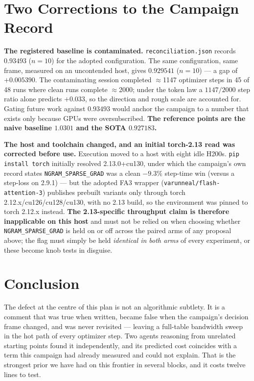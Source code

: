 \documentclass{article}
\begin{document}
\section{Two Corrections to the Campaign Record}
\textbf{The registered baseline is contaminated.} \texttt{reconciliation.json} records $0.93493$ ($n{=}10$) for the adopted configuration. The same configuration, same frame, measured on an uncontended host, gives $0.929541$ ($n{=}10$) --- a gap of $+0.005390$. The contaminating session completed $\approx$1147 optimizer steps in 45 of 48 runs where clean runs complete $\approx$2000; under the token law a $1147/2000$ step ratio alone predicts $+0.033$, so the direction and rough scale are accounted for. Gating future work against $0.93493$ would anchor the campaign to a number that exists only because GPUs were oversubscribed. \textbf{The reference points are the naive baseline $1.0301$ and the SOTA $0.927183$.}

\textbf{The host and toolchain changed, and an initial torch-2.13 read was corrected before use.} Execution moved to a host with eight idle H200s. \texttt{pip install torch} initially resolved 2.13.0+cu130, under which the campaign's own record states \texttt{NGRAM\_SPARSE\_GRAD} was a clean $-9.3\%$ step-time win (versus a step-loss on 2.9.1) --- but the adopted FA3 wrapper (\texttt{varunneal/flash-attention-3}) publishes prebuilt variants only through torch 2.12.x/cu126/cu128/cu130, with no 2.13 build, so the environment was pinned to torch 2.12.x instead. \textbf{The 2.13-specific throughput claim is therefore inapplicable on this host} and must not be relied on when choosing whether \texttt{NGRAM\_SPARSE\_GRAD} is held on or off across the paired arms of any proposal above; the flag must simply be held \emph{identical in both arms} of every experiment, or these become knob tests in disguise.

\section{Conclusion}
The defect at the centre of this plan is not an algorithmic subtlety. It is a comment that was true when written, became false when the campaign's decision frame changed, and was never revisited --- leaving a full-table bandwidth sweep in the hot path of every optimizer step. Two agents reasoning from unrelated starting points found it independently, and its predicted cost coincides with a term this campaign had already measured and could not explain. That is the strongest prior we have had on this frontier in several blocks, and it costs twelve lines to test.
\end{document}
